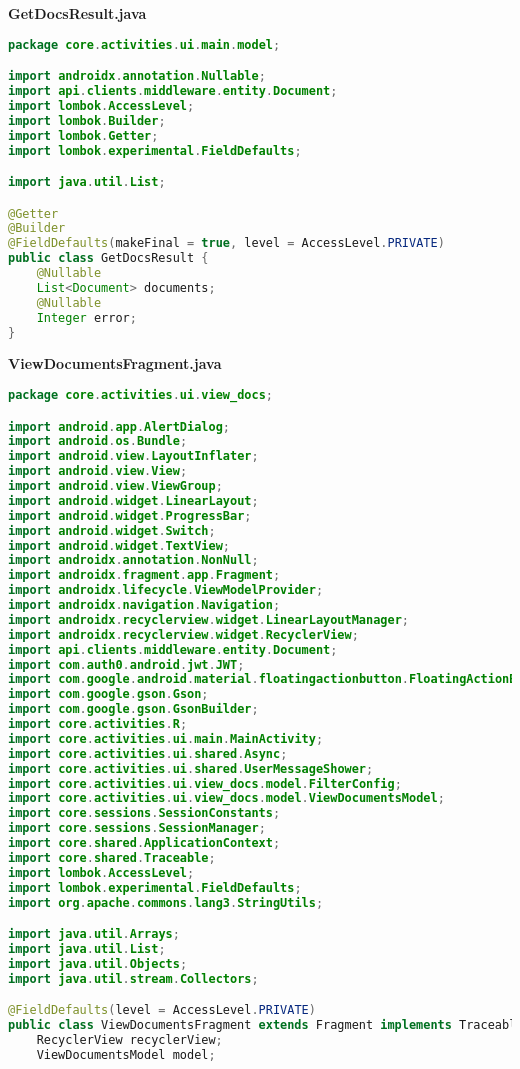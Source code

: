 \textbf{GetDocsResult.java}
\begin{lstlisting}[language=Java]
package core.activities.ui.main.model;

import androidx.annotation.Nullable;
import api.clients.middleware.entity.Document;
import lombok.AccessLevel;
import lombok.Builder;
import lombok.Getter;
import lombok.experimental.FieldDefaults;

import java.util.List;

@Getter
@Builder
@FieldDefaults(makeFinal = true, level = AccessLevel.PRIVATE)
public class GetDocsResult {
	@Nullable
	List<Document> documents;
	@Nullable
	Integer error;
}

\end{lstlisting}
\textbf{ViewDocumentsFragment.java}
\begin{lstlisting}[language=Java]
package core.activities.ui.view_docs;

import android.app.AlertDialog;
import android.os.Bundle;
import android.view.LayoutInflater;
import android.view.View;
import android.view.ViewGroup;
import android.widget.LinearLayout;
import android.widget.ProgressBar;
import android.widget.Switch;
import android.widget.TextView;
import androidx.annotation.NonNull;
import androidx.fragment.app.Fragment;
import androidx.lifecycle.ViewModelProvider;
import androidx.navigation.Navigation;
import androidx.recyclerview.widget.LinearLayoutManager;
import androidx.recyclerview.widget.RecyclerView;
import api.clients.middleware.entity.Document;
import com.auth0.android.jwt.JWT;
import com.google.android.material.floatingactionbutton.FloatingActionButton;
import com.google.gson.Gson;
import com.google.gson.GsonBuilder;
import core.activities.R;
import core.activities.ui.main.MainActivity;
import core.activities.ui.shared.Async;
import core.activities.ui.shared.UserMessageShower;
import core.activities.ui.view_docs.model.FilterConfig;
import core.activities.ui.view_docs.model.ViewDocumentsModel;
import core.sessions.SessionConstants;
import core.sessions.SessionManager;
import core.shared.ApplicationContext;
import core.shared.Traceable;
import lombok.AccessLevel;
import lombok.experimental.FieldDefaults;
import org.apache.commons.lang3.StringUtils;

import java.util.Arrays;
import java.util.List;
import java.util.Objects;
import java.util.stream.Collectors;

@FieldDefaults(level = AccessLevel.PRIVATE)
public class ViewDocumentsFragment extends Fragment implements Traceable, UserMessageShower {
	RecyclerView recyclerView;
	ViewDocumentsModel model;
	

\end{lstlisting}
